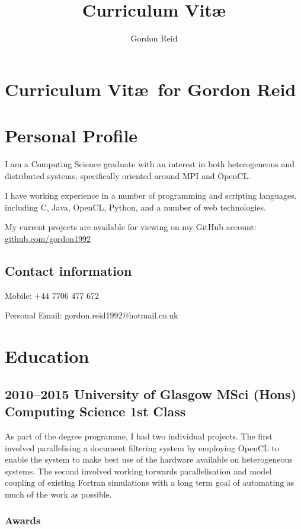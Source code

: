\documentclass[11pt,a4paper]{article}
\title{Curriculum Vit\ae}
\author{Gordon Reid}
\begin{document}
\section*{Curriculum Vit\ae\ for Gordon Reid}


\section*{Personal Profile}

I am a Computing Science graduate with an interest in both heterogeneous and
distributed systems, specifically oriented around MPI and OpenCL\@.

I have working experience in a number of programming and scripting languages,
including C, Java, OpenCL, Python, and a number of web technologies.

My current projects are available for viewing on my GitHub
account: \url{github.com/gordon1992}

\subsection*{Contact information}
Mobile: +44 7706 477 672

Personal Email: gordon.reid1992@hotmail.co.uk

\section*{Education}

\subsection*{2010--2015 University of Glasgow MSci (Hons) Computing Science 1st Class}

As part of the degree programme, I had two individual projects. The first
involved parallelising a document filtering system by employing OpenCL to enable
the system to make best use of the hardware available on heterogeneous systems.
The second involved working torwards parallelisation and model coupling of
existing Fortran simulations with a long term goal of automating as much of the
work as possible.

\subsubsection*{Awards}
\end{document}
